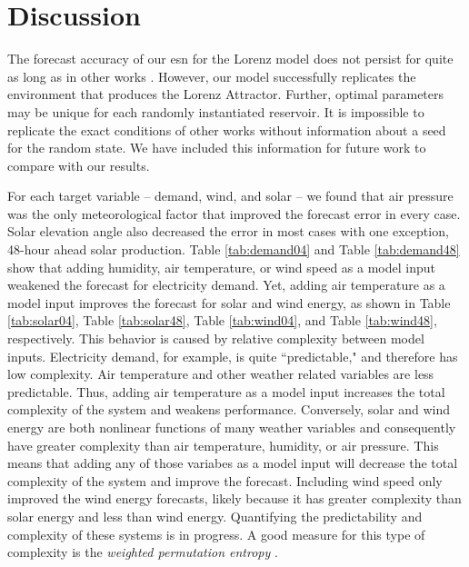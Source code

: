 \section{Discussion}

The forecast accuracy of our \gls{esn} for the Lorenz model does not persist
for quite as long as in other works \cite{pathak_using_2017}. However, our
model successfully replicates the environment that produces the Lorenz
Attractor. Further, optimal parameters may be unique for each randomly
instantiated reservoir. It is impossible to replicate the exact conditions of
other works without information about a seed for the random state. We have
included this information for future work to compare with our results.

For each target variable -- demand, wind, and solar -- we found that air
pressure was the only meteorological factor that improved the forecast error in
every case. Solar elevation angle also decreased the error in most cases with
one exception, 48-hour ahead solar production. Table \ref{tab:demand04} and
Table \ref{tab:demand48} show that adding humidity, air temperature, or wind
speed as a model input weakened the forecast for electricity demand. Yet,
adding air temperature as a model input improves the forecast for solar and
wind energy, as shown in Table
\ref{tab:solar04}, Table \ref{tab:solar48}, Table \ref{tab:wind04}, and Table
\ref{tab:wind48}, respectively. This behavior is caused by relative complexity
between model inputs. Electricity demand, for example, is quite ``predictable,"
and therefore has low complexity. Air temperature and other weather related
variables are less predictable. Thus, adding air temperature as a model input
increases the total complexity of the system and weakens performance.
 Conversely, solar and wind energy are both nonlinear functions of many weather
 variables and consequently have greater complexity than air temperature,
 humidity, or air pressure. This means that adding any of those variabes as a
 model input will decrease the total complexity of the system and improve the
 forecast. Including wind speed only improved the wind energy forecasts, likely
 because it has greater complexity than solar energy and less than wind energy.
 Quantifying the predictability and complexity of these systems is in progress.
 A good measure for this type of complexity is the \textit{weighted permutation entropy}
 \cite{fadlallah_weighted-permutation_2013,garland_model-free_2014, pennekamp_intrinsic_2019}.

